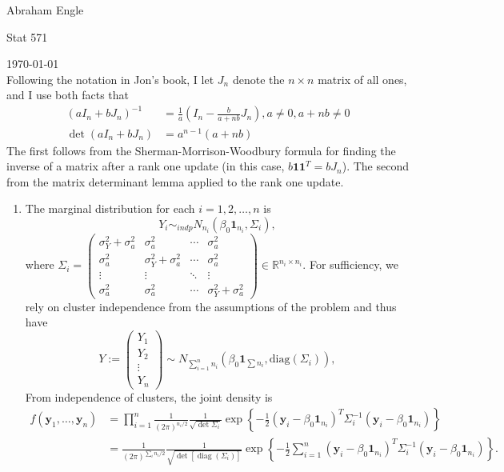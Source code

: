\documentclass[11pt]{article}
\newcommand{\diag}{\operatorname{diag}}
\newcommand{\R}{\mathbb{R}}
\begin{document}
\pagestyle{empty}
\hfill Abraham Engle

\hfill Stat 571

\hfill \today
\\Following the notation in Jon's book, I let $J_n$ denote the $n\times n$ matrix of all ones, and I use both facts that
	\begin{align*}
		(aI_n+bJ_n)^{-1} &= \frac{1}{a}\left(I_n - \frac{b}{a+nb}J_n \right), a\neq 0, a+nb\neq 0 \\
		\det(aI_n + bJ_n) &=  a^{n-1}(a+nb)
	\end{align*}
The first follows from the Sherman-Morrison-Woodbury formula for finding the inverse of a matrix after a rank one update (in this case, $b\bm{1}\bm{1}^T=bJ_n$). The second from the matrix determinant lemma applied to the rank one update.
\begin{enumerate}
	\item The marginal distribution for each $i=1,2,\dotsc,n$ is
	\[ 
		Y_i \sim_{indp} N_{n_i}\left(\beta_0\bm{1}_{n_i},\Sigma_i\right),
	\]
	where $\Sigma_i = \begin{pmatrix}
		\sigma^2_Y + \sigma^2_a & \sigma^2_a & \cdots & \sigma^2_a \\
		\sigma^2_a & \sigma^2_Y + \sigma^2_a & \cdots & \sigma^2_a\\
		\vdots & \vdots & \ddots & \vdots \\
		\sigma^2_a & \sigma^2_a & \cdots & \sigma^2_Y + \sigma^2_a
	\end{pmatrix}\in \R^{n_i\times n_i}$. For sufficiency, we rely on cluster independence from the assumptions of the problem and thus have
	\[
		Y:=\begin{pmatrix}
			Y_1 \\ Y_2 \\ \vdots \\ Y_n
		\end{pmatrix} \sim N_{\sum_{i=1}^n n_i} \left(\beta_0 \bm{1}_{\sum n_i}, \mathrm{diag}(\Sigma_i)\right),
	\]
	From independence of clusters, the joint density is
	\begin{align*}
		f(\bm{y}_1,\dotsc,\bm{y}_n) &= \prod_{i=1}^n \frac{1}{(2\pi)^{n_i/2}}\frac{1}{\sqrt{\det\Sigma_i}}\exp\left\{-\frac{1}{2}(\bm{y}_i - \beta_0\bm{1}_{n_i})^T\Sigma_i^{-1}(\bm{y}_i-\beta_0\bm{1}_{n_i}) \right\} \\
		&= \frac{1}{(2\pi)^{\sum_i n_i/2}}\frac{1}{\sqrt{\det[\diag(\Sigma_i)]}}\exp\left\{-\frac{1}{2}\sum_{i=1}^n(\bm{y}_i - \beta_0\bm{1}_{n_i})^T\Sigma_i^{-1}(\bm{y}_i - \beta_0\bm{1}_{n_i})\right\}.

\end{align*}
\end{enumerate}
\end{document}
